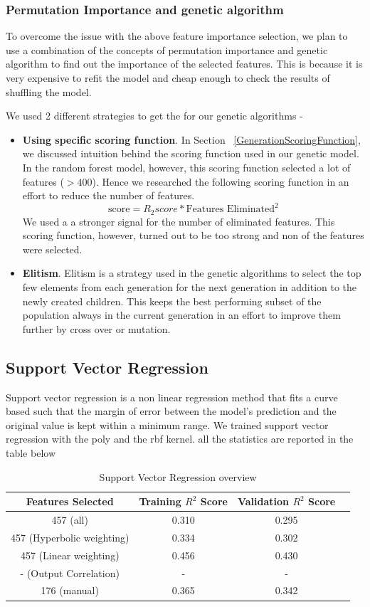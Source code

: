 \documentclass[11pt]{article}
\begin{document}
\subsubsection{Permutation Importance and genetic algorithm}
To overcome the issue with the above feature importance selection, we plan to use a combination of the concepts of permutation importance and genetic algorithm to find out the importance of the selected features.
This is because it is very expensive to refit the model and cheap enough to check the results of shuffling the model.

We used 2 different strategies to get the for our genetic algorithms -
\begin{itemize}
\item \textbf{Using specific scoring function}.  In Section ~\ref{GenerationScoringFunction},  we discussed intuition behind the scoring function used in our genetic model.
In the random forest model,  however,  this scoring function selected a lot of features ($> 400$). Hence we researched the following scoring function in an effort to reduce the number of features. 
$$
\textrm{score} = R_2 score * \textrm{Features Eliminated}^2
$$
We used a a stronger signal for the number of eliminated features. This scoring function, however,  turned out to be too strong and non of the features were selected.
\item \textbf{Elitism}.  Elitism is a strategy used in the genetic algorithms to select the top few elements from each generation for the next generation in addition to the newly created children. This keeps the best performing subset of the population always in the current generation in an effort to improve them further by cross over or mutation.
\end{itemize}


\subsection{Support Vector Regression}
Support vector regression is a non linear regression method that fits a  curve based such that the margin of error between the model's prediction and the original value is kept within a minimum range.
We trained support vector regression with the poly and the rbf kernel.
all the statistics are reported in the table below

\begin{table} [h!]
\centering
 \begin{tabular}{ | c | c | c | c | }
\hline
\textbf{Features Selected} & \textbf{Training $R^2$ Score} & \textbf{Validation $R^2$ Score} \\ [0.5 ex]
\hline \hline
457 (all) & 0.310 & 0.295\\
457 (Hyperbolic weighting) & 0.334 & 0.302\\
457 (Linear weighting) & 0.456 & 0.430 \\
- (Output Correlation)\footnotemark[1] & - & -  \\ 
176 (manual) & 0.365  & 0.342  \\ [1ex]
\hline
\end{tabular}
\caption{Support Vector Regression overview}
\label {table:2}
\end{table}
\end{document}
